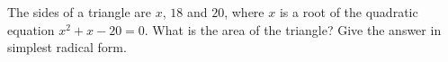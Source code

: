 The sides of a triangle are $x$, $18$ and $20$, where $x$ is a root of the quadratic equation $x^2+x-20=0$. What is the area of the triangle? Give the answer in simplest radical form.
